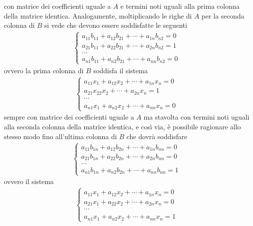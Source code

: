 con matrice dei coefficienti uguale a $A$ e termini noti uguali alla
prima colonna della matrice identica. Analogamente, moltiplicando
le righe di $A$ per la seconda colonna di $B$ si vede che devono
essere soddisfatte le seguenti
\begin{eqnarray*}
  \begin{cases}
    a_{11}b_{11} +a_{12}b_{21}+\cdots + a_{1n}b_{n2}=0\\
    a_{21}b_{11} +a_{22}b_{21}+\cdots + a_{2n}b_{n2}=1\\
    \dots\\
    a_{n1}b_{11}+a_{n2}b_{21}+\cdots + a_{nn}b_{n2}=0
  \end{cases}
\end{eqnarray*}
ovvero la prima colonna di $B$ soddisfa il sistema
\begin{eqnarray}
  \label{eq:Compinveeproddimatrici10}
  \begin{cases}
    a_{11}x_1+a_{12}x_2+\cdots+a_{1n}x_n=0\\
    a_{21}x_{22}x_2+\cdots +a_{2n}x_n=1\\
    \cdots\\
    a_{n1}x_1+a_{n2}x_2+\cdots+a_{nn}x_n=0
  \end{cases}
\end{eqnarray}
sempre con matrice dei coefficienti uguale a $A$ ma stavolta con
termini noti uguali alla seconda colonna della matrice identica,
e così via, è possibile ragionare allo stesso modo fino all'ultima
colonna di $B$ che dovrà soddisfare
\begin{eqnarray*}
  \begin{cases}
    a_{11}b_{1n}+a_{12}b_{2n}+\cdots +a_{1n}b_{nn}=0\\
    a_{21}b_{1n}+a_{22}b_{2n}+\cdots+a_{2n}b_{nn}=0\\
    \dots\\
    a_{n1}b_{1n}+a_{n2}b_{2n}+\cdots+a_{nn}b_{nn}=1
  \end{cases}
\end{eqnarray*}
ovvero il sistema
\begin{eqnarray}
  \label{eq:Compinveeproddimatrici11}
  \begin{cases}
    a_{11}x_1+a_{12}x_2+\cdots+a_{1n}x_n=0\\
  a_{21}x_1+a_{22}x_2+\cdots+a_{2n}x_n=0\\
  \cdots\\
  a_{n1}x_1+a_{n2}x_2+\cdots+a_{nn}x_n=1
  \end{cases}
\end{eqnarray}
